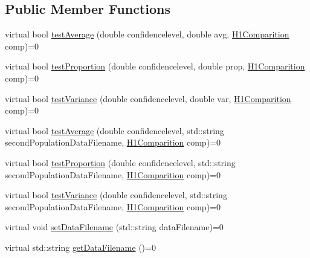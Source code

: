 \subsection*{Public Member Functions}
\begin{DoxyCompactItemize}
\item 
virtual bool \hyperlink{class_hypothesis_tester__if_a00a01e530acaf3f4db644b439c1c162e}{test\-Average} (double confidencelevel, double avg, \hyperlink{class_hypothesis_tester__if_a89153ff990252f9f79856a2f2532c349}{H1\-Comparition} comp)=0
\item 
virtual bool \hyperlink{class_hypothesis_tester__if_a9a07fdf3648371e4595acb3599f7b03b}{test\-Proportion} (double confidencelevel, double prop, \hyperlink{class_hypothesis_tester__if_a89153ff990252f9f79856a2f2532c349}{H1\-Comparition} comp)=0
\item 
virtual bool \hyperlink{class_hypothesis_tester__if_a1734abfa4bd0c3e8fc67c96172aca728}{test\-Variance} (double confidencelevel, double var, \hyperlink{class_hypothesis_tester__if_a89153ff990252f9f79856a2f2532c349}{H1\-Comparition} comp)=0
\item 
virtual bool \hyperlink{class_hypothesis_tester__if_a0c0314bc8ff8bef239583f2c8af4ed56}{test\-Average} (double confidencelevel, std\-::string second\-Population\-Data\-Filename, \hyperlink{class_hypothesis_tester__if_a89153ff990252f9f79856a2f2532c349}{H1\-Comparition} comp)=0
\item 
virtual bool \hyperlink{class_hypothesis_tester__if_a10b193007a3fde816120b32903241336}{test\-Proportion} (double confidencelevel, std\-::string second\-Population\-Data\-Filename, \hyperlink{class_hypothesis_tester__if_a89153ff990252f9f79856a2f2532c349}{H1\-Comparition} comp)=0
\item 
virtual bool \hyperlink{class_hypothesis_tester__if_ad2360392ccf3858da38092448152c33d}{test\-Variance} (double confidencelevel, std\-::string second\-Population\-Data\-Filename, \hyperlink{class_hypothesis_tester__if_a89153ff990252f9f79856a2f2532c349}{H1\-Comparition} comp)=0
\item 
virtual void \hyperlink{class_hypothesis_tester__if_ae7cfc801a3c0206844e3bc73e0b4234a}{set\-Data\-Filename} (std\-::string data\-Filename)=0
\item 
virtual std\-::string \hyperlink{class_hypothesis_tester__if_a37b02ea209d8f6b566af9e2fff6511cc}{get\-Data\-Filename} ()=0
\end{DoxyCompactItemize}


